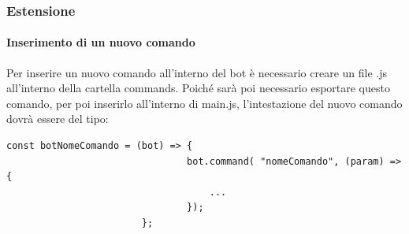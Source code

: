 \subsubsection{Estensione}
	\paragraph{Inserimento di un nuovo comando}
		Per inserire un nuovo comando all'interno del bot è necessario creare un file .js all'interno della cartella commands.
		\newline
		Poiché sarà poi necessario esportare questo comando, per poi inserirlo all'interno di main.js, l'intestazione del nuovo comando dovrà essere del tipo:
		\begin{verbatim}const botNomeComando = (bot) => {
								bot.command( "nomeComando", (param) => {
							 		...
							 	});
						}; 
		\end{verbatim}	